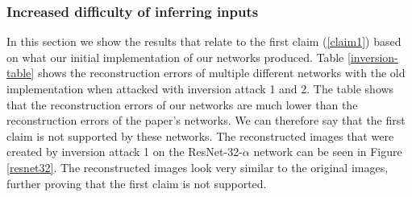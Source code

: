 \subsubsection{Increased difficulty of inferring inputs}
In this section we show the results that relate to the first claim (\ref{claim1}) based on what our initial implementation of our networks produced.
Table \ref{inversion-table} shows the reconstruction errors of multiple different networks with the old implementation when attacked with inversion attack 1 and 2. The table shows that the reconstruction errors of our networks are much lower than the reconstruction errors of the paper's networks. We can therefore say that the first claim is not supported by these networks.
The reconstructed images that were created by inversion attack 1 on the ResNet-32-$\alpha$ network can be seen in Figure \ref{resnet32}. The reconstructed images look very similar to the original images, further proving that the first claim is not supported.

